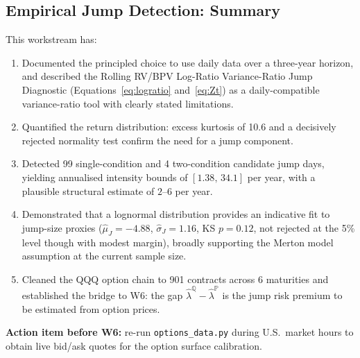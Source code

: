 \documentclass[12pt]{article}
\begin{document}
\subsection*{Empirical Jump Detection: Summary}

This workstream has:
\begin{enumerate}[label=\arabic*.]
  \item Documented the principled choice to use daily data over a three-year horizon, and described the Rolling RV/BPV Log-Ratio Variance-Ratio Jump Diagnostic (Equations~\eqref{eq:logratio} and~\eqref{eq:Zt}) as a daily-compatible variance-ratio tool with clearly stated limitations.
  \item Quantified the return distribution: excess kurtosis of 10.6 and a decisively rejected normality test confirm the need for a jump component.
  \item Detected 99 single-condition and 4 two-condition candidate jump days, yielding annualised intensity bounds of $[1.38,\,34.1]$ per year, with a plausible structural estimate of $2$--$6$ per year.
  \item Demonstrated that a lognormal distribution provides an indicative fit to jump-size proxies ($\hat{\mu}_J=-4.88$, $\hat{\sigma}_J=1.16$, KS $p=0.12$, not rejected at the 5\% level though with modest margin), broadly supporting the Merton model assumption at the current sample size.
  \item Cleaned the QQQ option chain to 901 contracts across 6 maturities and established the bridge to W6: the gap $\hat{\lambda}^{\mathbb{Q}}-\hat{\lambda}^{\mathbb{P}}$ is the jump risk premium to be estimated from option prices.
\end{enumerate}

\bigskip
\noindent\textbf{Action item before W6:} re-run \texttt{options\_data.py} during U.S.\ market hours to obtain live bid/ask quotes for the option surface calibration.
\end{document}
